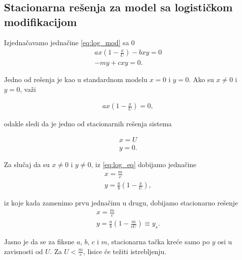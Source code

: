 \documentclass[a4paper]{article}
\begin{document}
\subsection{Stacionarna rešenja za model sa logističkom modifikacijom}

Izjednačavamo jednačine \eqref{eq:log_mod} sa 0
\begin{equation}
    \label{eq:log_eq}
    \begin{aligned}
        ax(1 - \frac{x}{U}) - bxy = 0\\
        -my + cxy = 0.
    \end{aligned}
\end{equation}

Jedno od rešenja je kao u standardnom modelu $x=0$ i $y=0$.
Ako su $x\neq0$ i $y=0$, važi

\begin{displaymath}
    \begin{aligned}
        ax(1 - \frac{x}{U}) = 0,
    \end{aligned}
\end{displaymath}

odakle sledi da je jedno od stacionarnih rešenja sistema

\begin{displaymath}
    \begin{aligned}
        x=U\\
        y=0.
    \end{aligned}
\end{displaymath}

Za slučaj da su $x\neq0$ i $y\neq0$, iz \eqref{eq:log_eq} dobijamo jednačine
\begin{displaymath}
    \label{eq:log_stac}
    \begin{aligned}
        x = \frac{m}{c}\\
        y = \frac{a}{b}(1 - \frac{x}{U}),
    \end{aligned}
\end{displaymath}

iz koje kada zamenimo prvu jednačinu u drugu, dobijamo
stacionarno rešenje
\begin{equation}
    \label{eq:log_stac}
    \begin{aligned}
        x = \frac{m}{c}\\
        y = \frac{a}{b}(1 - \frac{m}{cU})\equiv y_s.
    \end{aligned}
\end{equation}

Jasno je da se za fiksne $a$, $b$, $c$ i $m$,
stacionarna tačka kreće samo po $y$ osi u zavisnosti od $U$.
Za $U<\frac{m}{c}$, lisice će težiti istrebljenju.
\end{document}
